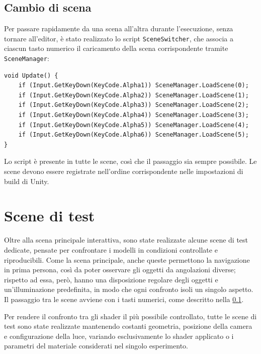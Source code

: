 \documentclass[12pt,a4paper,twoside]{book}
\begin{document}
\begin{minipage}{\textwidth}

\subsection{Cambio di scena}
\label{subsec:scene-switch}

Per passare rapidamente da una scena all'altra durante l'esecuzione, senza tornare all'editor, è stato realizzato lo script \texttt{SceneSwitcher}, che associa a ciascun tasto numerico il caricamento della scena corrispondente tramite \texttt{SceneManager}:

\begin{lstlisting}[style=hlsl,
    caption={Cambio di scena tramite i tasti numerici.},
    label={lst:scene-switch}]
void Update() {
    if (Input.GetKeyDown(KeyCode.Alpha1)) SceneManager.LoadScene(0);
    if (Input.GetKeyDown(KeyCode.Alpha2)) SceneManager.LoadScene(1);
    if (Input.GetKeyDown(KeyCode.Alpha3)) SceneManager.LoadScene(2);
    if (Input.GetKeyDown(KeyCode.Alpha4)) SceneManager.LoadScene(3);
    if (Input.GetKeyDown(KeyCode.Alpha5)) SceneManager.LoadScene(4);
    if (Input.GetKeyDown(KeyCode.Alpha6)) SceneManager.LoadScene(5);
}
\end{lstlisting}

Lo script è presente in tutte le scene, così che il passaggio sia sempre possibile. Le scene devono essere registrate nell'ordine corrispondente nelle impostazioni di build di Unity.

\end{minipage}

\section{Scene di test}
\label{sec:scene-test}

Oltre alla scena principale interattiva, sono state realizzate alcune scene di test dedicate, pensate per confrontare i modelli in condizioni controllate e riproducibili. Come la scena principale, anche queste permettono la navigazione in prima persona, così da poter osservare gli oggetti da angolazioni diverse; rispetto ad essa, però, hanno una disposizione regolare degli oggetti e un'illuminazione predefinita, in modo che ogni confronto isoli un singolo aspetto. Il passaggio tra le scene avviene con i tasti numerici, come descritto nella \cref{subsec:scene-switch}.

Per rendere il confronto tra gli shader il più possibile controllato, tutte le scene di test sono state realizzate mantenendo costanti geometria, posizione della camera e configurazione della luce, variando esclusivamente lo shader applicato o i parametri del materiale considerati nel singolo esperimento.
\end{document}
